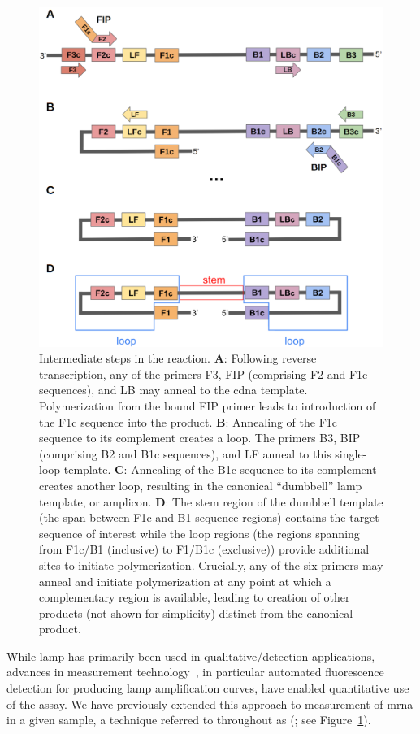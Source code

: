 \documentclass[../thesis.tex]{subfiles}
\begin{document}
\begin{figure}[!tpb] 
\centering
\includegraphics[width=5in]{../figures/chapter2/paper_lamp_fig.png}
\caption{Intermediate steps in the  reaction. \textbf{A}: Following reverse transcription, any of the primers F3, FIP (comprising F2 and F1c sequences), and LB may anneal to the \gls{cdna} template. Polymerization from the bound FIP primer leads to introduction of the F1c sequence into the product. \textbf{B}: Annealing of the F1c sequence to its complement creates a loop. The primers B3, BIP (comprising B2 and B1c sequences), and LF anneal to this single-loop template. \textbf{C}: Annealing of the B1c sequence to its complement creates another loop, resulting in the canonical ``dumbbell'' \gls{lamp} template, or amplicon. \textbf{D}: The stem region of the dumbbell template (the span between F1c and B1 sequence regions) contains the target sequence of interest while the loop regions (the regions spanning from F1c/B1 (inclusive) to F1/B1c (exclusive)) provide additional sites to initiate polymerization. Crucially, any of the six primers may anneal and initiate polymerization at any point at which a complementary region is available, leading to creation of other products (not shown for simplicity) distinct from the canonical product.\label{fig:lampoverview}}
\end{figure}
While \gls{lamp} has primarily been used in qualitative/detection applications, advances in measurement technology~\citep{zhang_brief_2014, becherer_loop-mediated_2020}, in particular automated fluorescence detection for producing \gls{lamp} amplification curves, have enabled quantitative use of the assay. We have previously extended this approach to measurement of \gls{mrna} in a given sample, a technique referred to throughout as  (\citealp{remmel_diagnostic_2022}; see Figure~\ref{fig:lampoverview}). 
\end{document}
